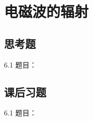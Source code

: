 \chapter{电磁波的辐射}

\section{思考题}

\begin{thinking}{6.1}
  题目：\todoanswer

  \begin{solution}
    \todoanswer
  \end{solution}
\end{thinking}

\section{课后习题}

\begin{exercise}{6.1}
  题目：\todoanswer

  \begin{solution}
    \todoanswer
  \end{solution}
\end{exercise}
